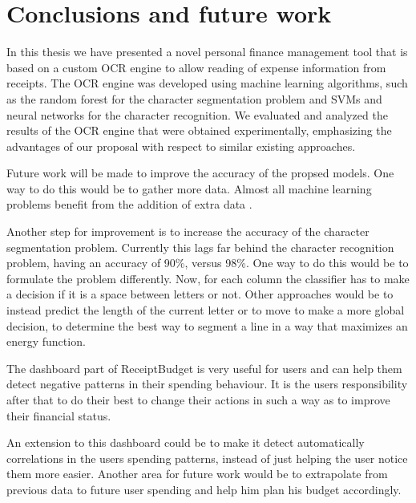 \chapter{Conclusions and future work}
\label{chap:conclusion}
In this thesis we have presented a novel personal finance management tool that is based on a custom OCR engine to allow reading of expense information from receipts. The OCR engine was developed using machine learning algorithms, such as the random forest for the character segmentation problem and SVMs and neural networks for the character recognition. We evaluated and analyzed the results of the OCR engine that were obtained experimentally, emphasizing the advantages of our proposal with respect to similar existing approaches. 

Future work will be made to improve the accuracy of the propsed models. One way to do this would be to gather more data. Almost all machine learning problems benefit from the addition of extra data \cite{halevy2009unreasonable}.

Another step for improvement is to increase the accuracy of the character segmentation problem. Currently this lags far behind the character recognition problem, having an accuracy of 90\%, versus 98\%. One way to do this would be to formulate the problem differently. Now, for each column the classifier has to make a decision if it is a space between letters or not. Other approaches would be to instead predict the length of the current letter or to move to make a more global decision, to determine the best way to segment a line in a way that maximizes an energy function.

The dashboard part of ReceiptBudget is very useful for users and can help them detect negative patterns in their spending behaviour. It is the users responsibility after that to do their best to change their actions in such a way as to improve their financial status. 

An extension to this dashboard could be to make it detect automatically correlations in the users spending patterns, instead of just helping the user notice them more easier. Another area for future work would be to extrapolate from previous data to future user spending and help him plan his budget accordingly.